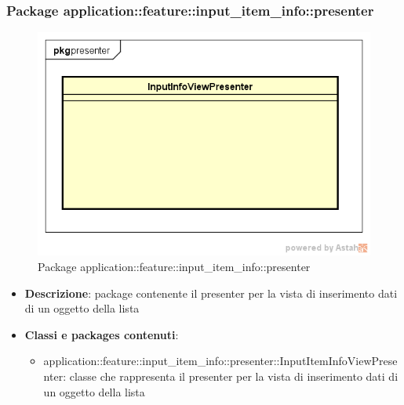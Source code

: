 \subsubsection{Package application::feature::input\_item\_info::presenter}
\label{Package application::feature::input_item_info::presenter}
\begin{figure}[H]
	\centering
	\includegraphics[scale=0.5]{Sezioni/Packages/Application/input_item_info_presenter.png}
	\caption{Package application::feature::input\_item\_info::presenter}
\end{figure}
\begin{itemize}
	\item \textbf{Descrizione}: package contenente il presenter per la vista di inserimento dati di un oggetto della lista
	\item \textbf{Classi e packages contenuti}:
	\begin{itemize}
	\item application::feature::input\_item\_info::presenter::InputItemInfoViewPresenter: classe che rappresenta il presenter per la vista di inserimento dati di un oggetto della lista
	\end{itemize}
\end{itemize}


